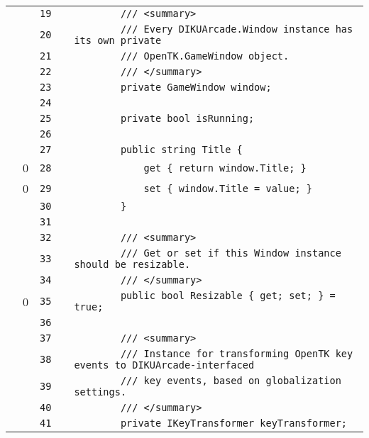 \documentclass[a4paper,landscape,10pt]{article}
\begin{document}
\begin{longtable}[l]{lrrll}
\cellcolor{gray} &  & \verb~19~ & & \verb~        /// <summary>~\\
\cellcolor{gray} &  & \verb~20~ & & \verb~        /// Every DIKUArcade.Window instance has its own private~\\
\cellcolor{gray} &  & \verb~21~ & & \verb~        /// OpenTK.GameWindow object.~\\
\cellcolor{gray} &  & \verb~22~ & & \verb~        /// </summary>~\\
\cellcolor{gray} &  & \verb~23~ & & \verb~        private GameWindow window;~\\
\cellcolor{gray} &  & \verb~24~ & & \verb~~\\
\cellcolor{gray} &  & \verb~25~ & & \verb~        private bool isRunning;~\\
\cellcolor{gray} &  & \verb~26~ & & \verb~~\\
\cellcolor{gray} &  & \verb~27~ & & \verb~        public string Title {~\\
\cellcolor{red} & 0 & \verb~28~ & & \verb~            get { return window.Title; }~\\
\cellcolor{red} & 0 & \verb~29~ & & \verb~            set { window.Title = value; }~\\
\cellcolor{gray} &  & \verb~30~ & & \verb~        }~\\
\cellcolor{gray} &  & \verb~31~ & & \verb~~\\
\cellcolor{gray} &  & \verb~32~ & & \verb~        /// <summary>~\\
\cellcolor{gray} &  & \verb~33~ & & \verb~        /// Get or set if this Window instance should be resizable.~\\
\cellcolor{gray} &  & \verb~34~ & & \verb~        /// </summary>~\\
\cellcolor{red} & 0 & \verb~35~ & & \verb~        public bool Resizable { get; set; } = true;~\\
\cellcolor{gray} &  & \verb~36~ & & \verb~~\\
\cellcolor{gray} &  & \verb~37~ & & \verb~        /// <summary>~\\
\cellcolor{gray} &  & \verb~38~ & & \verb~        /// Instance for transforming OpenTK key events to DIKUArcade-interfaced~\\
\cellcolor{gray} &  & \verb~39~ & & \verb~        /// key events, based on globalization settings.~\\
\cellcolor{gray} &  & \verb~40~ & & \verb~        /// </summary>~\\
\cellcolor{gray} &  & \verb~41~ & & \verb~        private IKeyTransformer keyTransformer;~\\

\end{longtable}
\end{document}
